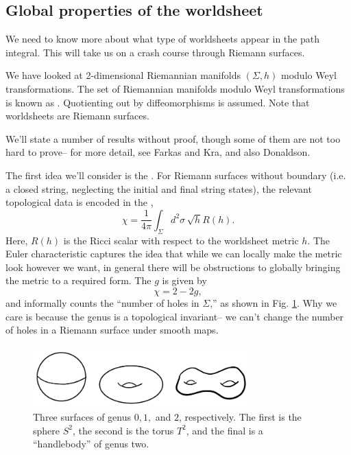 \subsection*{Global properties of the worldsheet} We need to know more about what type of worldsheets appear in the path integral. This will take us on a crash course through Riemann surfaces.

We have looked at 2-dimensional Riemannian manifolds $(\Sigma,h)$ modulo Weyl transformations. The set of Riemannian manifolds modulo Weyl transformations is known as . Quotienting out by diffeomorphisms is assumed. Note that worldsheets are Riemann surfaces.

We'll state a number of results without proof, though some of them are not too hard to prove-- for more detail, see Farkas and Kra, and also Donaldson.

The first idea we'll consider is the . For Riemann surfaces without boundary (i.e. a closed string, neglecting the initial and final string states), the relevant topological data is encoded in the ,
\begin{equation}
    \chi = \frac{1}{4\pi} \int_\Sigma d^2 \sigma \,\sqrt{h} R(h).
\end{equation}
Here, $R(h)$ is the Ricci scalar with respect to the worldsheet metric $h$. The Euler characteristic captures the idea that while we can locally make the metric look however we want, in general there will be obstructions to globally bringing the metric to a required form. The  $g$ is given by
\begin{equation}
    \chi = 2-2g,
\end{equation}
and informally counts the ``number of holes in $\Sigma$,'' as shown in Fig. \ref{fig:riemanngenus}. Why we care is because the genus is a topological invariant-- we can't change the number of holes in a Riemann surface under smooth maps.

\begin{figure}
    \centering
    \includegraphics[width=0.75\textwidth]{2019/02/20190201_genus.png}
    \caption{Three surfaces of genus $0,1,$ and $2$, respectively. The first is the sphere $S^2$, the second is the torus $T^2$, and the final is a ``handlebody'' of genus two.}
    \label{fig:riemanngenus}
\end{figure}

